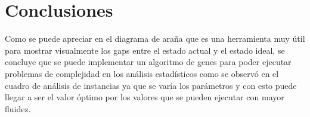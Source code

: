 \documentclass{article}
\begin{document}
\newpage
\section{Conclusiones}\label{}
Como se puede apreciar en el diagrama de araña que es una herramienta muy útil para mostrar visualmente los gaps entre el estado actual y el estado ideal, se concluye que se puede implementar un algoritmo de genes para poder ejecutar problemas de complejidad en los análisis estadísticos como se observó en el cuadro de análisis de instancias ya que se varía los parámetros y con esto puede llegar a ser el valor óptimo por los valores que se pueden ejecutar con mayor fluidez.



\cite{nestor1}
\cite{elisa1}
\end{document}
